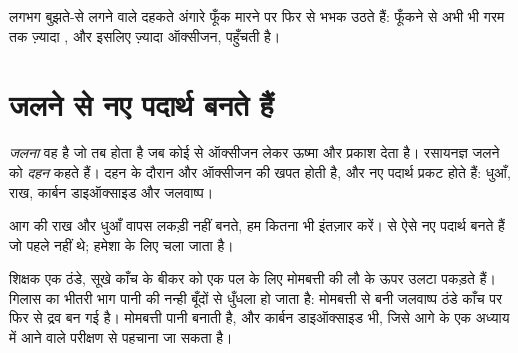 \begin{example}[अंगारों पर फूँकना]\label{ex:g4:what-a-fire-needs:embers}
लगभग बुझते-से लगने वाले दहकते अंगारे फूँक मारने पर फिर से भभक उठते हैं:
फूँकने से अभी भी गरम  तक ज़्यादा , और इसलिए ज़्यादा ऑक्सीजन,
पहुँचती है।
\end{example}

\section{जलने से नए पदार्थ बनते हैं}

\begin{definition}\label{def:g4:what-a-fire-needs:burning}
\emph{जलना} वह है जो तब होता है जब कोई   से ऑक्सीजन
लेकर ऊष्मा और प्रकाश देता है। रसायनज्ञ जलने को
\emph{दहन} कहते हैं। दहन के दौरान  और
ऑक्सीजन की खपत होती है, और नए पदार्थ प्रकट होते हैं: धुआँ, राख, कार्बन
डाइऑक्साइड और जलवाष्प।
\end{definition}

\begin{proposition}\label{prop:g4:what-a-fire-needs:new}
आग की राख और धुआँ वापस लकड़ी नहीं बनते, हम कितना भी इंतज़ार करें।
 से ऐसे नए पदार्थ बनते हैं जो पहले नहीं थे;  हमेशा के लिए
चला जाता है।
\end{proposition}

\begin{inthelab}
शिक्षक एक ठंडे, सूखे काँच के बीकर को एक पल के लिए मोमबत्ती की लौ के ऊपर
उलटा पकड़ते हैं। गिलास का भीतरी भाग पानी की नन्ही बूँदों से धुँधला हो जाता
है:  मोमबत्ती से बनी जलवाष्प ठंडे काँच पर फिर से द्रव बन गई है। 
मोमबत्ती पानी बनाती है, और कार्बन डाइऑक्साइड भी, जिसे आगे के एक अध्याय
में आने वाले परीक्षण से पहचाना जा सकता है।
\end{inthelab}


